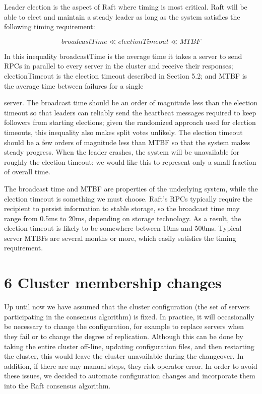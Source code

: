 \documentclass[
]{article}
\begin{document}
Leader election is the aspect of Raft where timing is most critical.
Raft will be able to elect and maintain a steady leader as long as the
system satisfies the following timing requirement:

\[
b r o a d c a s t T i m e \ll e l e c t i o n T i m e o u t \ll M T B F
\]

In this inequality broadcastTime is the average time it takes a server
to send RPCs in parallel to every server in the cluster and receive
their responses; electionTimeout is the election timeout described in
Section 5.2; and MTBF is the average time between failures for a single

server. The broadcast time should be an order of magnitude less than the
election timeout so that leaders can reliably send the heartbeat
messages required to keep followers from starting elections; given the
randomized approach used for election timeouts, this inequality also
makes split votes unlikely. The election timeout should be a few orders
of magnitude less than MTBF so that the system makes steady progress.
When the leader crashes, the system will be unavailable for roughly the
election timeout; we would like this to represent only a small fraction
of overall time.

The broadcast time and MTBF are properties of the underlying system,
while the election timeout is something we must choose. Raft's RPCs
typically require the recipient to persist information to stable
storage, so the broadcast time may range from 0.5ms to 20ms, depending
on storage technology. As a result, the election timeout is likely to be
somewhere between 10ms and 500ms. Typical server MTBFs are several
months or more, which easily satisfies the timing requirement.

\section{6 Cluster membership changes}\label{cluster-membership-changes}

Up until now we have assumed that the cluster configuration (the set of
servers participating in the consensus algorithm) is fixed. In practice,
it will occasionally be necessary to change the configuration, for
example to replace servers when they fail or to change the degree of
replication. Although this can be done by taking the entire cluster
off-line, updating configuration files, and then restarting the cluster,
this would leave the cluster unavailable during the changeover. In
addition, if there are any manual steps, they risk operator error. In
order to avoid these issues, we decided to automate configuration
changes and incorporate them into the Raft consensus algorithm.
\end{document}
